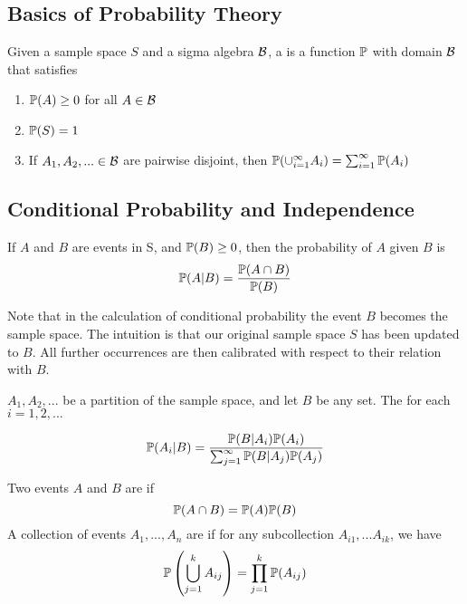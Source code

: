 \subsection{Basics of Probability Theory}
\begin{definition}
    Given a sample space $S$ and a sigma algebra $\mathcal B$, a  is a function $\mathbb P$ with domain $\mathcal B$ that satisfies
    \begin{enumerate}
        \item $\mathbb P(A) \geq 0$ for all $A \in \mathcal B$
        \item $\mathbb P(S) = 1$
        \item If $A_1, A_2,... \in \mathcal B$ are pairwise disjoint, then $\mathbb P(\cup_{i=1}^{\infty}A_i) = \sum_{i=1}^{\infty}\mathbb P(A_i)$
    \end{enumerate}
\end{definition}


\subsection{Conditional Probability and Independence}
\begin{definition}
    If $A$ and $B$ are events in S, and $\mathbb P(B) \geq 0$, then the  probability of $A$ given $B$ is
    $$
    \mathbb P(A|B) = \frac{\mathbb P(A \cap B)}{\mathbb P(B)}
    $$
\end{definition}
Note that in the calculation of conditional probability the event $B$ becomes the sample space. The intuition is that our original sample space $S$ has been updated to $B$. All further occurrences are then calibrated with respect to their relation with $B$.

\begin{theorem}

$A_1, A_2,...$ be a partition of the sample space, and let $B$ be any set. The for each $i = 1,2,...$

$$
\mathbb P(A_i|B) = \frac{\mathbb P(B|A_i)\mathbb P(A_i)}{\sum_{j=1}^{\infty}\mathbb P(B|A_j)\mathbb P(A_j)}
$$
\end{theorem}

\begin{definition}
    Two events $A$ and $B$ are  if
    $$
    \mathbb P(A \cap B) = \mathbb P(A)\mathbb P(B)
    $$
    A collection of events $A_1,...,A_n$ are  if for any subcollection $A_{i1},...A_{ik}$, we have 
    $$
    \mathbb P\left( \bigcup_{j=1}^{k}A_{ij} \right ) = \prod_{j=1}^{k} \mathbb P(A_{ij})
    $$
\end{definition}
